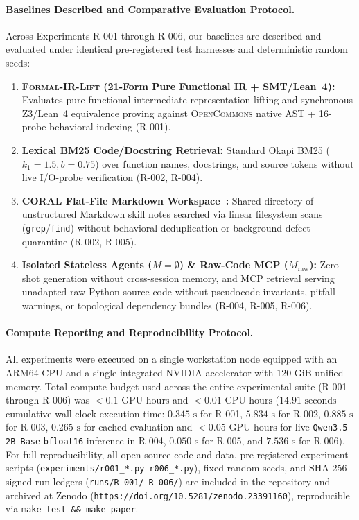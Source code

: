 \documentclass[10pt,twocolumn]{article}
\begin{document}
\paragraph{Baselines Described and Comparative Evaluation Protocol.}
Across Experiments R-001 through R-006, our baselines are described and evaluated under identical pre-registered test harnesses and deterministic random seeds:
\begin{enumerate}
    \item \textbf{\textsc{Formal-IR-Lift} (21-Form Pure Functional IR + SMT/Lean~4):} Evaluates pure-functional intermediate representation lifting and synchronous Z3/Lean~4 equivalence proving against \textsc{OpenCommons} native AST + 16-probe behavioral indexing (R-001).
    \item \textbf{Lexical BM25 Code/Docstring Retrieval:} Standard Okapi BM25 ($k_1 = 1.5, b = 0.75$) over function names, docstrings, and source tokens without live I/O-probe verification (R-002, R-004).
    \item \textbf{\textsc{CORAL} Flat-File Markdown Workspace~\cite{coral2026}:} Shared directory of unstructured Markdown skill notes searched via linear filesystem scans (\texttt{grep}/\texttt{find}) without behavioral deduplication or background defect quarantine (R-002, R-005).
    \item \textbf{Isolated Stateless Agents ($M = \emptyset$) \& Raw-Code MCP ($M_{\text{raw}}$):} Zero-shot generation without cross-session memory, and MCP retrieval serving unadapted raw Python source code without pseudocode invariants, pitfall warnings, or topological dependency bundles (R-004, R-005, R-006).
\end{enumerate}

\paragraph{Compute Reporting and Reproducibility Protocol.}
All experiments were executed on a single workstation node equipped with an ARM64 CPU and a single integrated NVIDIA accelerator with $120\text{ GiB}$ unified memory. Total compute budget used across the entire experimental suite (R-001 through R-006) was $< 0.1\text{ GPU-hours}$ and $< 0.01\text{ CPU-hours}$ ($14.91\text{ seconds}$ cumulative wall-clock execution time: $0.345\text{ s}$ for R-001, $5.834\text{ s}$ for R-002, $0.885\text{ s}$ for R-003, $0.265\text{ s}$ for cached evaluation and $< 0.05\text{ GPU-hours}$ for live \texttt{Qwen3.5-2B-Base} \texttt{bfloat16} inference in R-004, $0.050\text{ s}$ for R-005, and $7.536\text{ s}$ for R-006). For full reproducibility, all open-source code and data, pre-registered experiment scripts (\texttt{experiments/r001\_*.py}--\texttt{r006\_*.py}), fixed random seeds, and SHA-256-signed run ledgers (\texttt{runs/R-001/}--\texttt{R-006/}) are included in the repository and archived at Zenodo (\texttt{https://doi.org/10.5281/zenodo.23391160}), reproducible via \texttt{make test \&\& make paper}.
\end{document}
